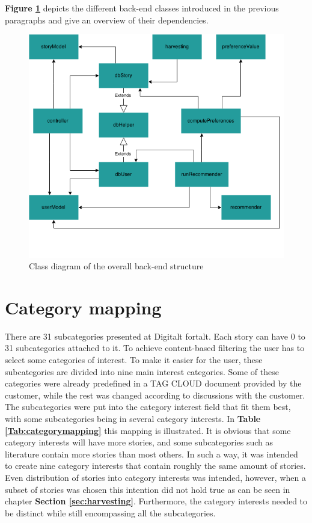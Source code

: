 \textbf{Figure \ref{Fig:overall_backend}} depicts the different back-end classes introduced in the previous paragraphs and give an overview of their dependencies.

\begin{figure}[h!]
	\centering
	\includegraphics[width=\textwidth]{fig/overall_backend}
	\caption{Class diagram of the overall back-end structure}
	\label{Fig:overall_backend}
\end{figure}

\section{Category mapping} 
\label{sec:categorymapping}

There are 31 subcategories presented at Digitalt fortalt. Each story can have 0 to 31 subcategories attached to it. To achieve content-based filtering the user has to select some categories of interest. To make it easier for the user, these subcategories are divided into nine main interest categories. Some of these categories were already predefined in a TAG CLOUD document provided by the customer, while the rest was changed according to discussions with the customer. The subcategories were put into the category interest field that fit them best, with some subcategories being in several category interests. In \textbf{Table \ref{Tab:categorymapping}} this mapping is illustrated. It is obvious that some category interests will have more stories, and some subcategories such as literature contain more stories than most others. In such a way, it was intended to create nine category interests that contain roughly the same amount of stories. Even distribution of stories into category interests was intended, however, when a subset of stories was chosen this intention did not hold true as can be seen in chapter \textbf{Section \ref{sec:harvesting}}. Furthermore, the category interests needed to be distinct while still encompassing all the subcategories. 

